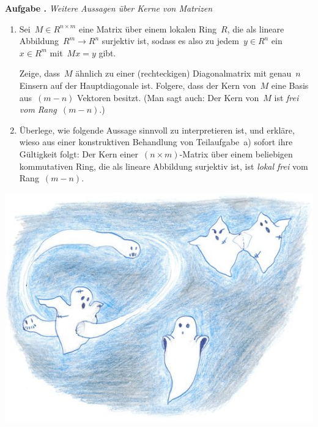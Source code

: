 \documentclass[a4paper,ngerman,12pt]{scrartcl}
\theoremstyle{definition}
\theoremstyle{plain}
\theoremstyle{remark}
\renewcommand{\_}{\mathpunct{.}\,}
\newcommand{\?}{\,{:}\,}
\newlength{\aufgabenskip}
\newcounter{aufgabennummer}
\newenvironment{aufgabe}[1]{
  \addtocounter{aufgabennummer}{1}
  \textbf{Aufgabe \theaufgabennummer{}.} \emph{#1} \par
}{\vspace{\aufgabenskip}}
\begin{document}
\begin{aufgabe}{Weitere Aussagen über Kerne von Matrizen}
\begin{enumerate}
\item Sei~$M \in R^{n \times m}$ eine Matrix über einem lokalen Ring~$R$, die
als lineare Abbildung~$R^m \to R^n$ surjektiv ist, sodass es also zu jedem~$y
\in R^n$ ein~$x \in R^m$ mit~$Mx = y$ gibt.

Zeige, dass~$M$ ähnlich zu einer (rechteckigen) Diagonalmatrix mit genau~$n$
Einsern auf der Hauptdiagonale ist. Folgere, dass der Kern von~$M$ eine Basis
aus~$(m - n)$ Vektoren besitzt. (Man sagt auch: Der Kern von~$M$ ist \emph{frei
vom Rang~$(m-n)$}.)

\item Überlege, wie folgende Aussage sinnvoll zu interpretieren ist, und
erkläre, wieso aus einer konstruktiven Behandlung von Teilaufgabe~a) sofort
ihre Gültigkeit folgt:
Der Kern einer~$(n \times m)$-Matrix über einem beliebigen kommutativen
Ring, die als lineare Abbildung surjektiv ist, ist \emph{lokal frei} vom
Rang~$(m-n)$.
\end{enumerate}
\end{aufgabe}

\enlargethispage{2cm}
\thispagestyle{empty}
\vfill
\begin{center}
  \includegraphics[scale=2.6]{phantome-klein.jpeg}
\end{center}
\end{document}
